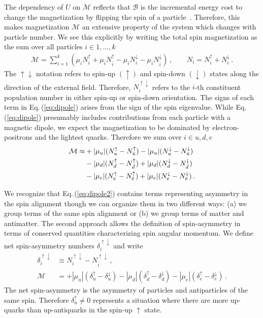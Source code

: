 \documentclass[epjST]{svjour}
\newcommand{\req}[1]{Eq.\,(\ref{#1})}
\begin{document}
The dependency of $U$ on $\mathcal{M}$ reflects that $\mathcal{B}$ is the incremental energy cost to change the magnetization by flipping the spin of a particle~\cite{Bali:2014kia}. Therefore, this makes magnetization $\mathcal{M}$ an extensive property of the system which changes with particle number. We see this explicitly by writing the total spin magnetization as the sum over all particles $i\in{1,\ldots,k}$
\begin{align}
\label{eq:dipole}
\mathcal{M} = \sum_{i=1}^{k}(\mu_{i}N_{i}^{\uparrow} + \mu_{\bar{i}}N_{\bar{i}}^{\uparrow} - \mu_{i}N_{i}^{\downarrow} - \mu_{\bar{i}}N_{\bar{i}}^{\downarrow})\,,\qquad
N_{i} = N_{i}^{\uparrow} + N_{i}^{\downarrow}\,.
\end{align}
The $\uparrow\downarrow$ notation refers to spin-up $(\uparrow)$ and spin-down $(\downarrow)$ states along the direction of the external field. Therefore, $N_{i}^{\uparrow\downarrow}$ refers to the $i$-th constituent population number in either spin-up or spin-down orientation. The signs of each term in \req{eq:dipole} arises from the sign of the spin eigenvalue. While \req{eq:dipole} presumably includes contributions from each particle with a magnetic dipole, we expect the magnetization to be dominated by electron-positrons and the lightest quarks. Therefore we sum over $i\in{u,d,e}$
\begin{align}
\notag\mathcal{M} \approx &+|\mu_{u}|(N_{u}^{\uparrow}-N_{\bar{u}}^{\uparrow})-|\mu_{u}|(N_{u}^{\downarrow}-N_{\bar{u}}^{\downarrow})\\
\notag &-|\mu_{d}|(N_{d}^{\uparrow}-N_{\bar{d}}^{\uparrow})+|\mu_{d}|(N_{d}^{\downarrow}-N_{\bar{d}}^{\downarrow})\\
\label{eq:dipole2}
&-|\mu_{e}|(N_{e}^{\uparrow}-N_{\bar{e}}^{\uparrow})+|\mu_{e}|(N_{e}^{\downarrow}-N_{\bar{e}}^{\downarrow})\,.
\end{align}

We recognize that \req{eq:dipole2} contains terms representing asymmetry in the spin alignment though we can organize them in two different ways: (a) we group terms of the same spin alignment or (b) we group terms of matter and antimatter. The second approach allows the definition of spin-asymmetry in terms of conserved quantities characterizing spin angular momentum. We define net spin-asymmetry numbers $\delta_{i}^{\uparrow\downarrow}$ and write
\begin{align}
\delta_{i}^{\uparrow\downarrow} &\equiv N_{i}^{\uparrow\downarrow}-N_{\bar{i}}^{\uparrow\downarrow}\,,\\
\mathcal{M} &= 
+|\mu_{u}|(\delta_{u}^{\uparrow}-\delta_{u}^{\downarrow})
-|\mu_{d}|(\delta_{d}^{\uparrow}-\delta_{d}^{\downarrow})
-|\mu_{e}|(\delta_{e}^{\uparrow}-\delta_{e}^{\downarrow})\,.
\end{align}
The net spin-asymmetry is the asymmetry of particles and antiparticles of the same spin. Therefore $\delta_{u}^{\uparrow}\neq0$ represents a situation where there are more up-quarks than up-antiquarks in the spin-up $\uparrow$ state.
\end{document}
